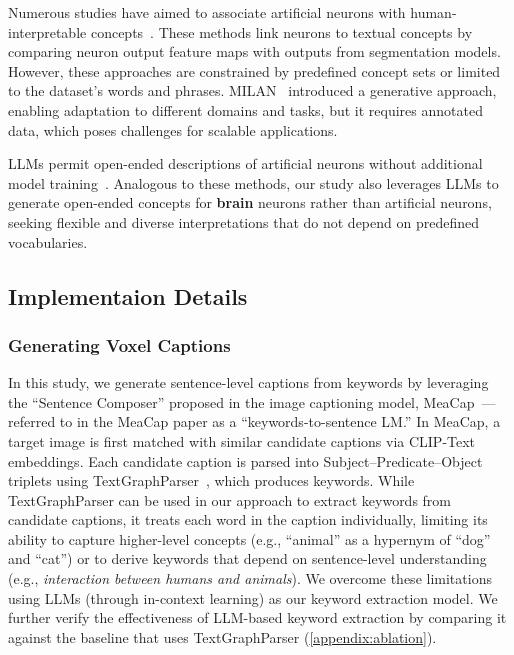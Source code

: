 Numerous studies have aimed to associate artificial neurons with human-interpretable concepts~\cite{bau2017network, mu2020compositional, oikarinen2022clip, kalibhat2023identifying, bykov2024labeling}. These methods link neurons to textual concepts by comparing neuron output feature maps with outputs from segmentation models. However, these approaches are constrained by predefined concept sets or limited to the dataset’s words and phrases. MILAN~\cite{hernandez2021natural} introduced a generative approach, enabling adaptation to different domains and tasks, but it requires annotated data, which poses challenges for scalable applications.

LLMs permit open-ended descriptions of artificial neurons without additional model training~\cite{singh2023explainingblackboxtext, bai2024describe, wu2024and, hoang2024llm}. Analogous to these methods, our study also leverages LLMs to generate open-ended concepts for \textbf{brain} neurons rather than artificial neurons, seeking flexible and diverse interpretations that do not depend on predefined vocabularies.


\subsection{Implementaion Details}
\subsubsection{Generating Voxel Captions}
\label{appendix:meacap}
In this study, we generate sentence-level captions from keywords by leveraging the ``Sentence Composer'' proposed in the image captioning model, MeaCap~\cite{zeng2024meacap}—referred to in the MeaCap paper as a ``keywords-to-sentence LM.'' In MeaCap, a target image is first matched with similar candidate captions via CLIP-Text embeddings. Each candidate caption is parsed into Subject–Predicate–Object triplets using TextGraphParser~\cite{li2023factual}, which produces keywords.
While TextGraphParser can be used in our approach to extract keywords from candidate captions, it treats each word in the caption individually, limiting its ability to capture higher-level concepts (e.g., ``animal'' as a hypernym of ``dog'' and ``cat'') or to derive keywords that depend on sentence-level understanding (e.g., \textit{interaction between humans and animals}). We overcome these limitations using LLMs (through in-context learning) as our keyword extraction model. We further verify the effectiveness of LLM-based keyword extraction by comparing it against the baseline that uses TextGraphParser (\ref{appendix:ablation}).

